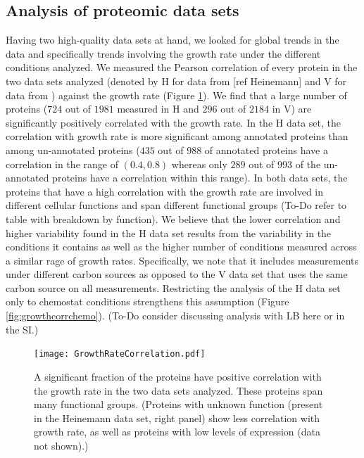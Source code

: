 \documentclass[notitlepage]{article}
\begin{document}
\subsection{Analysis of proteomic data sets}
Having two high-quality data sets at hand, we looked for global trends in the data and specifically trends involving the growth rate under the different conditions analyzed.
We measured the Pearson correlation of every protein in the two data sets analyzed (denoted by H for data from [ref Heinemann] and V for data from \parencite{Valgepea2013}) against the growth rate (Figure \ref{fig:growthcorr}).
We find that a large number of proteins ($724$ out of $1981$ measured in H and $296$ out of $2184$ in V) are significantly positively correlated with the growth rate.
In the H data set, the correlation with growth rate is more significant among annotated proteins than among un-annotated proteins ($435$ out of $988$ of annotated proteins have a correlation in the range of $(0.4,0.8)$ whereas only $289$ out of $993$ of the un-annotated proteins have a correlation within this range).
In both data sets, the proteins that have a high correlation with the growth rate are involved in different cellular functions and span different functional groups (To-Do refer to table with breakdown by function).
We believe that the lower correlation and higher variability found in the H data set results from the variability in the conditions it contains as well as the higher number of conditions measured across a similar rage of growth rates.
Specifically, we note that it includes measurements under different carbon sources as opposed to the V data set that uses the same carbon source on all measurements.
Restricting the analysis of the H data set only to chemostat conditions strengthens this assumption (Figure \ref{fig:growthcorrchemo}).
(To-Do consider discussing analysis with LB here or in the SI.)

\begin{figure}[h]
\centering
\texttt{[image: GrowthRateCorrelation.pdf]}
\caption{
A significant fraction of the proteins have positive correlation with the growth rate in the two data sets analyzed.
These proteins span many functional groups.
(Proteins with unknown function (present in the Heinemann data set, right panel) show less correlation with growth rate, as well as proteins with low levels of expression (data not shown).)
}
\label{fig:growthcorr}
\end{figure}
\end{document}
